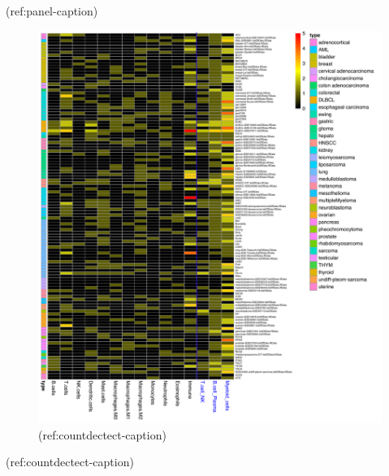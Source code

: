 \documentclass[12pt,]{book}
\theoremstyle{definition}
\theoremstyle{definition}
\theoremstyle{definition}
\theoremstyle{remark}
\begin{document}
(ref:panel-caption)

\begin{figure}

{\centering \includegraphics[width=1\linewidth]{figures-ext/count_detectability_immune_only} 

}

\caption[Cell markers expression in the metagenes]{(ref:countdectect-caption)}\label{fig:countdectect}
\end{figure}

(ref:countdectect-caption)
\end{document}
